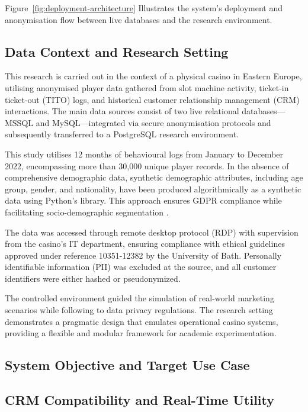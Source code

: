 \documentclass[12pt,a4paper]{report}
\begin{document}
Figure~\ref{fig:deployment-architecture} Illustrates the system’s deployment and anonymisation flow between live databases and the research environment.


\subsection{Data Context and Research Setting}

This research is carried out in the context of a physical casino in Eastern Europe, utilising anonymised player data gathered from slot machine activity, ticket-in ticket-out (TITO) logs, and historical customer relationship management (CRM) interactions.  The main data sources consist of two live relational databases—MSSQL and MySQL—integrated via secure anonymisation protocols and subsequently transferred to a PostgreSQL research environment. 

 This study utilises 12 months of behavioural logs from January to December 2022, encompassing more than 30,000 unique player records.  In the absence of comprehensive demographic data, synthetic demographic attributes, including age group, gender, and nationality, have been produced algorithmically as a synthetic data using Python's library. This approach ensures GDPR compliance while facilitating socio-demographic segmentation \citep{gdpr2016}.

 The data was accessed through remote desktop protocol (RDP) with supervision from the casino’s IT department, ensuring compliance with ethical guidelines approved under reference 10351-12382 by the University of Bath.  Personally identifiable information (PII) was excluded at the source, and all customer identifiers were either hashed or pseudonymized.

 The controlled environment guided the simulation of real-world marketing scenarios while following to data privacy regulations.  The research setting demonstrates a pragmatic design that emulates operational casino systems, providing a flexible and modular framework for academic experimentation.


\subsection{System Objective and Target Use Case}


\subsection{CRM Compatibility and Real-Time Utility}
\end{document}
